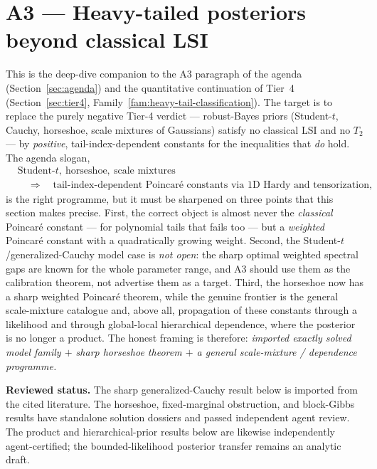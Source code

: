 \documentclass[../../main.tex]{subfiles}
\begin{document}
\section{A3 --- Heavy-tailed posteriors beyond classical LSI}
\label{sec:a3}

This is the deep-dive companion to the A3 paragraph of the agenda (Section~\ref{sec:agenda})
and the quantitative continuation of Tier~4 (Section~\ref{sec:tier4},
Family~\ref{fam:heavy-tail-classification}). The target is to replace the purely negative
Tier-4 verdict --- robust-Bayes priors (Student-$t$, Cauchy, horseshoe, scale mixtures of
Gaussians) satisfy no classical LSI and no $T_2$ --- by \emph{positive}, tail-index-dependent
constants for the inequalities that \emph{do} hold. The agenda slogan,
\begin{align*}
  &\text{Student-}t,\ \text{horseshoe},\ \text{scale mixtures} \\
  &\quad\Longrightarrow\quad
  \text{tail-index-dependent Poincar\'e constants via $1$D Hardy and tensorization,}
\end{align*}
is the right programme, but it must be sharpened on three points that this section makes
precise. First, the correct object is almost never the \emph{classical} Poincar\'e constant ---
for polynomial tails that fails too --- but a \emph{weighted} Poincar\'e constant with a
quadratically growing weight. Second, the Student-$t$/generalized-Cauchy model case is
\emph{not open}: the sharp optimal weighted spectral gaps are known for the whole parameter
range, and A3 should use them as the calibration theorem, not advertise them as a target.
Third, the horseshoe now has a sharp weighted Poincar\'e theorem, while the genuine frontier is the
general scale-mixture catalogue and, above all, propagation of these constants through a
likelihood and through global-local hierarchical dependence, where the posterior is no longer a
product. The honest framing is therefore: \emph{imported exactly solved model family $+$ sharp
horseshoe theorem $+$ a general scale-mixture / dependence programme.}

\noindent\textbf{Reviewed status.}
The sharp generalized-Cauchy result below is imported from the cited literature.  The horseshoe,
fixed-marginal obstruction, and block-Gibbs results have standalone solution dossiers and passed
independent agent review. The product and hierarchical-prior results below are likewise
independently agent-certified; the bounded-likelihood posterior transfer remains an analytic
draft.
\end{document}
